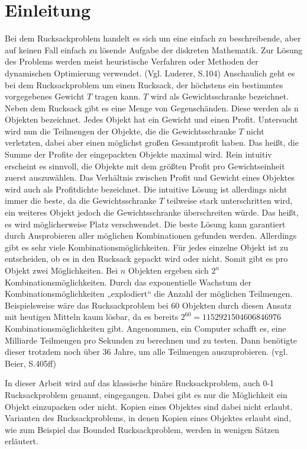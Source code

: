 
\chapter{Einleitung}
Bei dem Rucksackproblem handelt es sich um eine einfach zu beschreibende, aber auf keinen Fall einfach zu lösende Aufgabe der diskreten Mathematik. Zur Lösung des Problems werden meist heuristische Verfahren oder Methoden der dynamischen Optimierung verwendet. (Vgl.  Luderer, S.104)
Anschaulich geht es bei dem Rucksackproblem um einen Rucksack, der höchstens ein bestimmtes vorgegebenes Gewicht $T$ tragen kann. $T$ wird als Gewichtsschranke bezeichnet. Neben dem Rucksack gibt es eine Menge von Gegenschänden. Diese werden als n Objekten bezeichnet. Jedes Objekt hat ein Gewicht und einen Profit. Untersucht wird nun die Teilmengen der Objekte, die die Gewichtsschranke $T$ nicht verletzten, dabei aber einen möglichst großen Gesamtprofit haben. Das heißt, die Summe der Profite der eingepackten Objekte maximal wird. 
Rein intuitiv erscheint es sinnvoll, die Objekte mit dem größten Profit pro Gewichtseinheit zuerst auszuwählen. Das Verhältnis zwischen Profit und Gewicht eines Objektes wird auch als Profitdichte bezeichnet. Die intuitive Lösung ist allerdings nicht immer die beste, da die Gewichtsschranke $T$ teilweise stark unterschritten wird, ein weiteres Objekt jedoch die Gewichtsschranke überschreiten würde. Das heißt, es wird möglicherweise Platz verschwendet.
Die beste Lösung kann garantiert durch Ausprobieren aller möglichen Kombinationen gefunden werden. Allerdings gibt es sehr viele Kombinationsmöglichkeiten. Für jedes einzelne Objekt ist zu entscheiden, ob es in den Rucksack gepackt wird oder nicht. Somit gibt es pro Objekt zwei Möglichkeiten. Bei $n$ Objekten ergeben sich $2^n$ Kombinationsmöglichkeiten. Durch das exponentielle Wachstum der Kombinationsmöglichkeiten „explodiert“ die Anzahl der möglichen Teilmengen. Beispielsweise wäre das Rucksackproblem bei 60 Objekten durch diesen Ansatz mit heutigen Mitteln kaum lösbar, da es bereits $2^60 = 1 152 921 504 606 846 976$ Kombinationsmöglichkeiten gibt. Angenommen, ein Computer schafft es, eine Milliarde Teilmengen pro Sekunden zu berechnen und zu testen. Dann benötigte dieser trotzdem noch über 36 Jahre, um alle Teilmengen auszuprobieren. (vgl. Beier, S.405ff) 

In dieser Arbeit wird auf das klassische binäre Rucksackproblem, auch 0-1 Rucksackproblem genannt, eingegangen. Dabei gibt es nur die Möglichkeit ein Objekt einzupacken oder nicht. Kopien eines Objektes sind dabei nicht erlaubt. Varianten des Rucksackproblems, in denen Kopien eines Objektes erlaubt sind, wie zum Beispiel das Bounded Rucksackproblem, werden in wenigen Sätzen erläutert.

